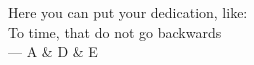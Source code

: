 \thispagestyle{empty}
{}

\vspace*{3cm}
\begin{center}
    Here you can put your dedication, like: \\ \medskip
    To time, that do not go backwards \\ \medskip
    --- A \& D \& E 
\end{center}